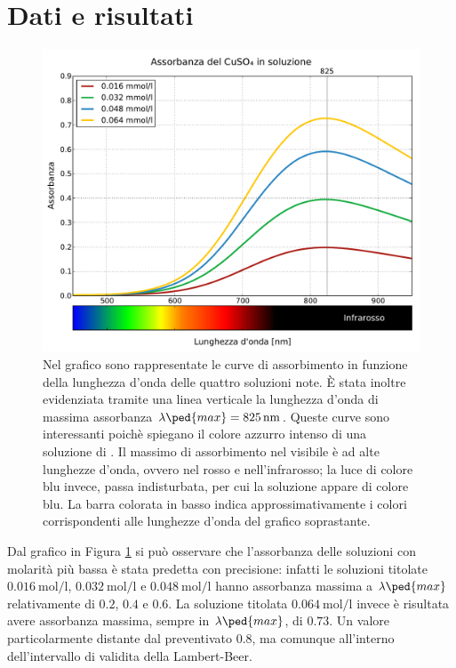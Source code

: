\section*{Dati e risultati}

\begin{figure}
    \includegraphics[scale=0.52]{concentrazioni.pdf}
    \caption{Nel grafico sono rappresentate le curve di assorbimento in funzione della lunghezza d'onda delle quattro soluzioni note.
        \`E stata inoltre evidenziata tramite una linea verticale la lunghezza d'onda di massima assorbanza $\lambda\ped{max} = \SI{825}{\nano\meter}$.
        Queste curve sono interessanti poichè spiegano il colore azzurro intenso di una soluzione di . Il massimo di assorbimento
        nel visibile è ad alte lunghezze d'onda, ovvero nel rosso e nell'infrarosso; la luce di colore blu invece, passa indisturbata, per cui la soluzione appare di
        colore blu. La barra colorata in basso indica approssimativamente i colori corrispondenti alle lunghezze d'onda del grafico soprastante.}
    \label{fig:conc}
\end{figure}

Dal grafico in Figura \ref{fig:conc} si può osservare che l'assorbanza delle soluzioni con molarità più bassa
è stata predetta con precisione: infatti le soluzioni titolate $\SI{0.016}{\mole\per\litre}$, $\SI{0.032}{\mole\per\litre}$
e $\SI{0.048}{\mole\per\litre}$ hanno assorbanza massima a $\lambda\ped{max}$ relativamente di $0.2$, $0.4$ e $0.6$.
La soluzione titolata $\SI{0.064}{\mole\per\litre}$ invece è risultata avere assorbanza massima, sempre in $\lambda\ped{max}$,
di $0.73$. Un valore particolarmente distante dal preventivato $0.8$, ma comunque all'interno dell'intervallo di validita della Lambert-Beer.


